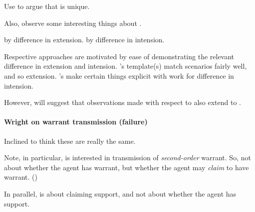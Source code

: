 \begin{note}
  Use to argue that \nI{} is unique.

  Also, observe some interesting things about \nI{}.

  \citeauthor{Wright:2011wn} by difference in extension.
  \citeauthor{Weisberg:2010to} by difference in intension.

  Respective approaches are motivated by ease of demonstrating the relevant difference in extension and intension.
  \citeauthor{Wright:2011wn}'s template(s) match scenarios fairly well, and so extension.
  \citeauthor{Weisberg:2010to}'s make certain things explicit with work for difference in intension.

  However, will suggest that observations made with respect to \citeauthor{Weisberg:2010to} also extend to \citeauthor{Wright:2011wn}.
\end{note}

\paragraph{Wright on warrant transmission (failure)}

\begin{note}
  Inclined to think these are really the same.

  Note, in particular, \citeauthor{Wright:2000tq} is interested in transmission of \emph{second-order} warrant.
  So, not about whether the agent has warrant, but whether the agent may \emph{claim} to have warrant.
  (\Citeyear[89]{Wright:2011wn})

  In parallel, \nI{} is about claiming support, and not about whether the agent has support.
\end{note}

